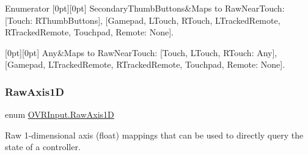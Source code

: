 \begin{DoxyEnumFields}{Enumerator}
[0pt][0pt]{}\mbox{\label{class_o_v_r_input_afa31aa573064be9bab8fc9e58cddeab6acfec5e25ea7af4398e8618195c792ec3}} 
Secondary\+Thumb\+Buttons&Maps to Raw\+Near\+Touch\+: \mbox{[}Touch\+: R\+Thumb\+Buttons\mbox{]}, \mbox{[}Gamepad, L\+Touch, R\+Touch, L\+Tracked\+Remote, R\+Tracked\+Remote, Touchpad, Remote\+: None\mbox{]}. \\
\hline

[0pt][0pt]{}\mbox{\label{class_o_v_r_input_afa31aa573064be9bab8fc9e58cddeab6aed36a1ef76a59ee3f15180e0441188ad}} 
Any&Maps to Raw\+Near\+Touch\+: \mbox{[}Touch, L\+Touch, R\+Touch\+: Any\mbox{]}, \mbox{[}Gamepad, L\+Tracked\+Remote, R\+Tracked\+Remote, Touchpad, Remote\+: None\mbox{]}. \\
\hline

\end{DoxyEnumFields}
\mbox{\label{class_o_v_r_input_a9c9eff2910ca07d1fb0e924273ebefaf}} 
\subsubsection{\texorpdfstring{Raw\+Axis1D}{RawAxis1D}}
{\footnotesize\ttfamily enum \mbox{\hyperlink{class_o_v_r_input_a9c9eff2910ca07d1fb0e924273ebefaf}{O\+V\+R\+Input.\+Raw\+Axis1D}}\hspace{0.3cm}{\ttfamily [strong]}}



Raw 1-\/dimensional axis (float) mappings that can be used to directly query the state of a controller. 


